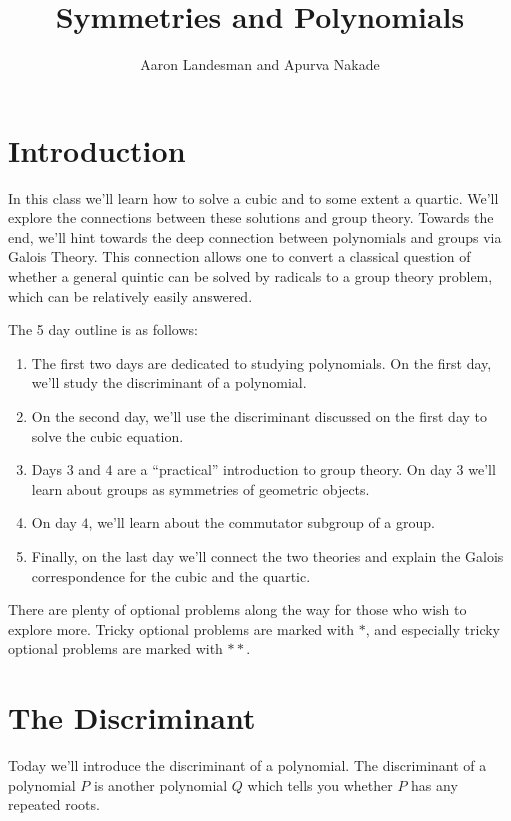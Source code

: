 \documentclass[reqno, 12pt, letter]{article}
\title{Symmetries and Polynomials}
\author{Aaron Landesman and Apurva Nakade}
\theoremstyle{plain}
\theoremstyle{definition}
\theoremstyle{remark}
\numberwithin{equation}{section}
\begin{document}
\maketitle


\section*{Introduction}
In this class we'll learn how to solve a cubic and to some extent a quartic. We'll explore the connections between these solutions and group theory.
Towards the end, we'll hint towards the deep connection between polynomials and groups via Galois Theory. This connection allows one to convert a classical question of whether a general quintic can be solved by radicals to a group theory problem, which can be relatively easily answered. 

The 5 day outline is as follows: 
\begin{enumerate}
	\item The first two days are dedicated to studying polynomials. On the first day, we'll study the discriminant of a polynomial.
	\item On the second day, we'll use the discriminant discussed on the first day to solve the cubic equation.
	\item Days $3$ and $4$ are a ``practical'' introduction to group theory. On day $3$ we'll learn about groups as symmetries of geometric objects.
	\item On day $4$, we'll learn about the commutator subgroup of a group.
	\item Finally, on the last day we'll connect the two theories and explain the Galois correspondence for the cubic and the quartic. 
\end{enumerate}
There are plenty of optional problems along the way for those who wish to explore more.
Tricky optional problems are marked with $*$, and especially tricky optional problems are marked with $**$.

\newpage
\section{The Discriminant}
Today we'll introduce the discriminant of a polynomial. The discriminant of a polynomial $P$ is another polynomial $Q$ which tells you
whether $P$ has any repeated roots.
\end{document}
